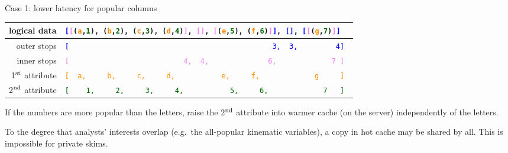 \documentclass[aspectratio=169]{beamer}
\begin{document}
\begin{frame}{Case 1: lower latency for popular columns}
\vspace{0.5 cm}

\begin{tabular}{r l}
\small logical data & {\tt\scriptsize \textcolor{blue}{[}\textcolor{violet}{[}(\textcolor{darkorange}{a},\textcolor{darkgreen}{1}), (\textcolor{darkorange}{b},\textcolor{darkgreen}{2}), (\textcolor{darkorange}{c},\textcolor{darkgreen}{3}), (\textcolor{darkorange}{d},\textcolor{darkgreen}{4})\textcolor{violet}{]}, \textcolor{violet}{[]}, \textcolor{violet}{[}(\textcolor{darkorange}{e},\textcolor{darkgreen}{5}), (\textcolor{darkorange}{f},\textcolor{darkgreen}{6})\textcolor{violet}{]}\textcolor{blue}{]}, \textcolor{blue}{[]}, \textcolor{blue}{[}\textcolor{violet}{[}(\textcolor{darkorange}{g},\textcolor{darkgreen}{7})\textcolor{violet}{]}\textcolor{blue}{]}\ \textcolor{white}{]}} \\\hline
\small outer stops & {\tt\scriptsize \textcolor{blue}{[\ \ \ \ \ \ \ \ \ \ \ \ \ \ \ \ \ \ \ \ \ \ \ \ \ \ \ \ \ \ \ \ \ \ \ \ \ \ \ \ \ \ \ \ \ \ \ \ 3,\ \ 3,\ \ \ \ \ \ \ \ \ 4]}} \\
\small inner stops & {\tt\scriptsize \textcolor{violet}{[\ \ \ \ \ \ \ \ \ \ \ \ \ \ \ \ \ \ \ \ \ \ \ \ \ \ \ 4,\ \ 4,\ \ \ \ \ \ \ \ \ \ \ \ \ \ 6,\ \ \ \ \ \ \ \ \ \ \ \ \ 7\ ]}} \\
\small 1$^{\mbox{\scriptsize st}}$ attribute & {\tt\scriptsize \textcolor{darkorange}{[\ \ a,\ \ \ \ \ b,\ \ \ \ \ c,\ \ \ \ \ d,\ \ \ \ \ \ \ \ \ \ \ e,\ \ \ \ \ f,\ \ \ \ \ \ \ \ \ \ \ \ \ g\ \ \ \ \ ]}} \\
\small 2$^{\mbox{\scriptsize nd}}$ attribute & {\tt\scriptsize \textcolor{darkgreen}{[\ \ \ \ 1,\ \ \ \ \ 2,\ \ \ \ \ 3,\ \ \ \ \ 4,\ \ \ \ \ \ \ \ \ \ \ 5,\ \ \ \ \ 6,\ \ \ \ \ \ \ \ \ \ \ \ \ 7\ \ \ ]}}
\end{tabular}

\vspace{0.5 cm}
If the numbers are more popular than the letters, raise the 2$^{\mbox{\scriptsize nd}}$ attribute into warmer cache (on the server) independently of the letters.

\vspace{0.5 cm}
To the degree that analysts' interests overlap (e.g.\ the all-popular kinematic variables), a copy in hot cache may be shared by all. This is impossible for private skims.
\end{frame}
\end{document}
